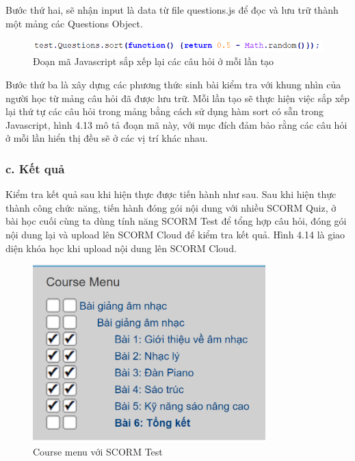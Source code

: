 Bước thứ hai, sẽ nhận input là data từ file questions.js để đọc và lưu trữ thành một mảng các Questions Object.\\

		\begin{center}
	\begin{figure}[htp]
		\begin{center}
			\includegraphics[width=15cm]{Chapter4/Pictures/picture413.png}
		\end{center}
		\caption{Đoạn mã Javascript sắp xếp lại các câu hỏi ở mỗi lần tạo}
		\label{refpicture510}
	\end{figure}
\end{center}

Bước thứ ba là xây dựng các phương thức sinh bài kiểm tra với khung nhìn của người học từ mảng câu hỏi đã được lưu trữ. Mỗi lần tạo sẽ thực hiện việc sắp xếp lại thứ tự các câu hỏi trong mảng bằng cách sử dụng hàm sort có sẵn trong Javascript, hình 4.13 mô tả đoạn mã này, với mục đích đảm bảo rằng các câu hỏi ở mỗi lần hiển thị đều sẽ ở các vị trí khác nhau.



\subsubsection{c. Kết quả}

Kiểm tra kết quả sau khi hiện thực được tiến hành như sau. Sau khi hiện thực thành công chức năng, tiến hành đóng gói nội dung với nhiều SCORM Quiz, ở bài học cuối cùng ta dùng tính năng SCORM Test để tổng hợp câu hỏi, đóng gói nội dung lại và upload lên SCORM Cloud để kiểm tra kết quả. Hình 4.14 là giao diện khóa học khi upload nội dung lên SCORM Cloud.

	\begin{center}
		\begin{figure}[htp]
			\begin{center}
				\includegraphics[width=9cm]{Chapter4/Pictures/picture414.png}
			\end{center}
			\caption{Course menu với SCORM Test}
			\label{refpicture511}
		\end{figure}
	\end{center}

